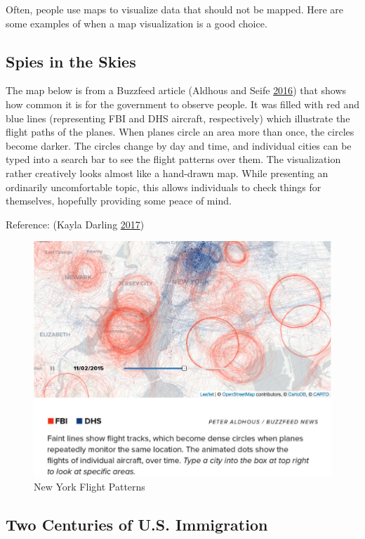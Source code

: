 \documentclass[]{book}
\begin{document}
Often, people use maps to visualize data that should not be mapped. Here
are some examples of when a map visualization is a good choice.

\subsection{Spies in the Skies}\label{spies-in-the-skies}

The map below is from a Buzzfeed article (Aldhous and Seife
\protect\hyperlink{ref-spies_sky}{2016}) that shows how common it is for
the government to observe people. It was filled with red and blue lines
(representing FBI and DHS aircraft, respectively) which illustrate the
flight paths of the planes. When planes circle an area more than once,
the circles become darker. The circles change by day and time, and
individual cities can be typed into a search bar to see the flight
patterns over them. The visualization rather creatively looks almost
like a hand-drawn map. While presenting an ordinarily uncomfortable
topic, this allows individuals to check things for themselves, hopefully
providing some peace of mind.

Reference: (Kayla Darling \protect\hyperlink{ref-cool_data}{2017})

\begin{figure}
\centering
\includegraphics{images/NYCflights.png}
\caption{New York Flight Patterns}
\end{figure}

\subsection{Two Centuries of U.S.
Immigration}\label{two-centuries-of-u.s.-immigration}
\end{document}
